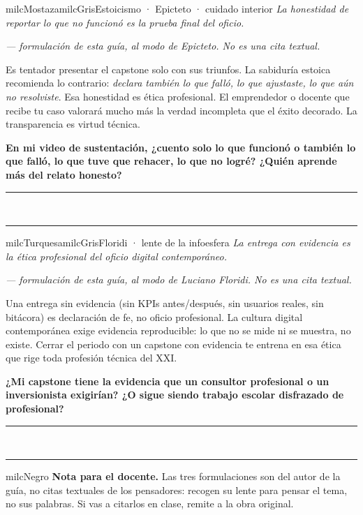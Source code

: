 \documentclass[11pt,letterpaper]{article}
\newcommand{\linead}[1]{\noindent\color{milcLinea}\rule{#1}{0.5pt}\color{milcNegro}}
\begin{document}
\begin{softbox}{milcMostaza}{milcGris}{Estoicismo · Epicteto · cuidado interior}
\textit{La honestidad de reportar lo que no funcionó es la prueba final del oficio.}

{\footnotesize\itshape\color{milcNegro!70}--- formulación de esta guía, al modo de Epicteto. No es una cita textual.}

Es tentador presentar el capstone solo con sus triunfos. La sabiduría estoica recomienda lo contrario: \emph{declara también lo que falló, lo que ajustaste, lo que aún no resolviste}. Esa honestidad es ética profesional. El emprendedor o docente que recibe tu caso valorará mucho más la verdad incompleta que el éxito decorado. La transparencia es virtud técnica.

\textbf{En mi video de sustentación, ¿cuento solo lo que funcionó o también lo que falló, lo que tuve que rehacer, lo que no logré? ¿Quién aprende más del relato honesto?}
\end{softbox}
\linead{\linewidth}\\[1mm]
\linead{\linewidth}

\begin{softbox}{milcTurquesa}{milcGris}{Floridi · lente de la infoesfera}
\textit{La entrega con evidencia es la ética profesional del oficio digital contemporáneo.}

{\footnotesize\itshape\color{milcNegro!70}--- formulación de esta guía, al modo de Luciano Floridi. No es una cita textual.}

Una entrega sin evidencia (sin KPIs antes/después, sin usuarios reales, sin bitácora) es declaración de fe, no oficio profesional. La cultura digital contemporánea exige evidencia reproducible: lo que no se mide ni se muestra, no existe. Cerrar el periodo con un capstone con evidencia te entrena en esa ética que rige toda profesión técnica del XXI.

\textbf{¿Mi capstone tiene la evidencia que un consultor profesional o un inversionista exigirían? ¿O sigue siendo trabajo escolar disfrazado de profesional?}
\end{softbox}
\linead{\linewidth}\\[1mm]
\linead{\linewidth}

\begin{infoband}{milcNegro}
\textbf{Nota para el docente.} Las tres formulaciones son del autor de la guía, no citas textuales de los pensadores: recogen su lente para pensar el tema, no sus palabras. Si vas a citarlos en clase, remite a la obra original.
\end{infoband}
\end{document}
